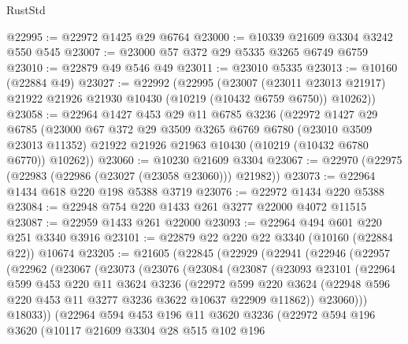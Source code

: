 \begin{lexlean}{RustStd}
\begin{coremodule}
@22995 := @22972 @1425 @29 @6764
@23000 := @10339 @21609 @3304 @3242 @550 @545
@23007 := @23000 @57 @372 @29 @5335 @3265 @6749 @6759
@23010 := @22879 @49 @546 @49
@23011 := @23010 @5335
@23013 := @10160 (@22884 @49)
@23027 := @22992
    (@22995
      (@23007
        (@23011 @23013 @21917)
        @21922
        @21926
        @21930
        @10430
        (@10219 (@10432 @6759 @6750))
        @10262))
@23058 := @22964
    @1427
    @453
    @29
    @11
    @6785
    @3236
    (@22972
      @1427
      @29
      @6785
      (@23000
        @67
        @372
        @29
        @3509
        @3265
        @6769
        @6780
        (@23010 @3509 @23013 @11352)
        @21922
        @21926
        @21963
        @10430
        (@10219 (@10432 @6780 @6770))
        @10262))
@23060 := @10230 @21609 @3304
@23067 := @22970 (@22975 (@22983 (@22986 (@23027 (@23058 @23060))) @21982))
@23073 := @22964 @1434 @618 @220 @198 @5388 @3719
@23076 := @22972 @1434 @220 @5388
@23084 := @22948 @754 @220 @1433 @261 @3277 @22000 @4072 @11515
@23087 := @22959 @1433 @261 @22000
@23093 := @22964 @494 @601 @220 @251 @3340 @3916
@23101 := @22879 @22 @220 @22 @3340 (@10160 (@22884 @22)) @10674
@23205 := @21605
    (@22845
      (@22929
        (@22941
          (@22946
            (@22957
              (@22962
                (@23067
                  (@23073
                    (@23076
                      (@23084
                        (@23087
                          (@23093
                            @23101
                            (@22964
                              @599
                              @453
                              @220
                              @11
                              @3624
                              @3236
                              (@22972
                                @599
                                @220
                                @3624
                                (@22948 @596 @220 @453 @11 @3277 @3236 @3622 @10637 @22909 @11862))
                              @23060)))
                        @18033))
                    (@22964
                      @594
                      @453
                      @196
                      @11
                      @3620
                      @3236
                      (@22972
                        @594
                        @196
                        @3620
                        (@10117
                          @21609
                          @3304
                          @28
                          @515
                          @102
                          @196

\end{coremodule}
\end{lexlean}

